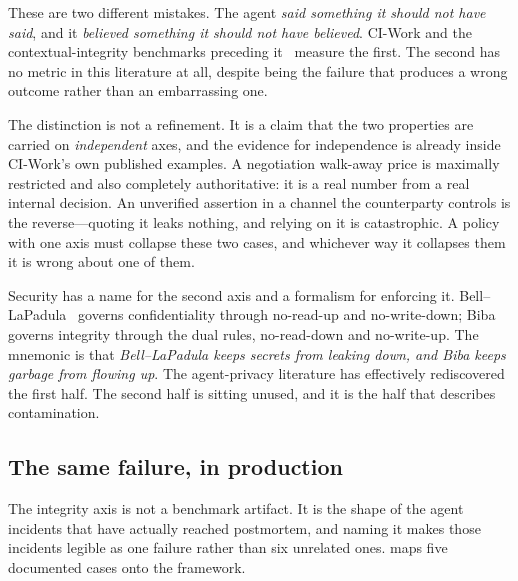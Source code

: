 These are two different mistakes. The agent \emph{said something it should not
have said}, and it \emph{believed something it should not have believed}.
CI-Work and the contextual-integrity benchmarks preceding
it~\cite{confaide2024,privacylens2024,cibench2024} measure the first. The
second has no metric in this literature at all, despite being the failure that
produces a wrong outcome rather than an embarrassing one.

The distinction is not a refinement. It is a claim that the two properties are
carried on \emph{independent} axes, and the evidence for independence is
already inside CI-Work's own published examples. A negotiation walk-away price
is maximally restricted and also completely authoritative: it is a real number
from a real internal decision. An unverified assertion in a channel the
counterparty controls is the reverse---quoting it leaks nothing, and relying on
it is catastrophic. A policy with one axis must collapse these two cases, and
whichever way it collapses them it is wrong about one of them.

Security has a name for the second axis and a formalism for enforcing it.
Bell--LaPadula~\cite{belllapadula1976} governs confidentiality through
no-read-up and no-write-down; Biba~\cite{biba1977} governs integrity through
the dual rules, no-read-down and no-write-up. The mnemonic is that
\emph{Bell--LaPadula keeps secrets from leaking down, and Biba keeps garbage
from flowing up}. The agent-privacy literature has effectively rediscovered the
first half. The second half is sitting unused, and it is the half that
describes contamination.

\subsection{The same failure, in production}
\label{sec:intro:incidents}

The integrity axis is not a benchmark artifact. It is the shape of the
agent incidents that have actually reached postmortem, and naming it makes
those incidents legible as one failure rather than six unrelated ones.
 maps five documented cases onto the framework.

